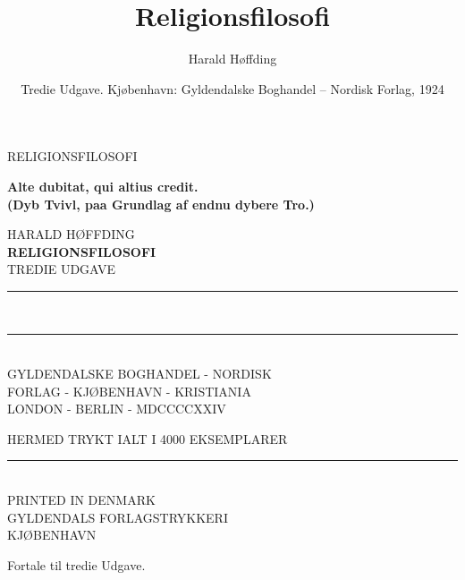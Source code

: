 \documentclass[12pt,a4paper,openany]{book}
\title{\textbf{Religionsfilosofi}}
\author{Harald Høffding}
\date{Tredie Udgave. Kjøbenhavn: Gyldendalske Boghandel -- Nordisk Forlag, 1924}
\begin{document}
\maketitle
\thispagestyle{empty}
\clearpage

\begin{center}RELIGIONSFILOSOFI\end{center}
\clearpage

\begin{flushright}\begin{minipage}{0.6\textwidth}\bfseries
Alte dubitat, qui altius credit.\\
\hfill{\small (Dyb Tvivl, paa Grundlag af endnu dybere Tro.)}
\end{minipage}\end{flushright}
\clearpage

\begin{center}
HARALD HØFFDING\\[18pt]
{\Large\textbf{RELIGIONSFILOSOFI}}\\[12pt]
{\small TREDIE UDGAVE}\\[60pt]
\rule{0.6\textwidth}{1.2pt}\\[-8pt]\rule{0.6\textwidth}{0.4pt}\\
{\small GYLDENDALSKE BOGHANDEL - NORDISK\\
FORLAG - KJØBENHAVN - KRISTIANIA\\
LONDON - BERLIN - MDCCCCXXIV}
\end{center}
\clearpage

\begin{center}\scriptsize
HERMED TRYKT IALT I 4000 EKSEMPLARER\\
\rule{0.8cm}{0.4pt}\\
PRINTED IN DENMARK\\
GYLDENDALS FORLAGSTRYKKERI\\
KJØBENHAVN
\end{center}
\clearpage

\begin{center}Fortale til tredie Udgave.\end{center}
\end{document}
